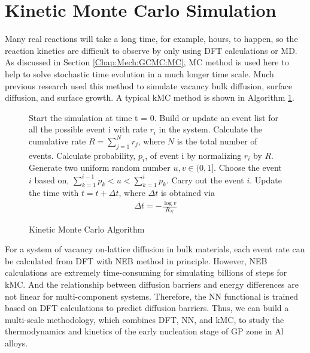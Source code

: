 \section{Kinetic Monte Carlo Simulation}
\label{chap:meth:KMC}

Many real reactions will take a long time, for example, hours, to happen, so the reaction kinetics are difficult to observe by only using \ac{DFT} calculations or \ac{MD}. As discussed in Section \ref{Chap:Mech:GCMC:MC}, \ac{MC} method is used here to help to solve stochastic time evolution in a much longer time scale. Much previous research used this method to simulate vacancy bulk diffusion, surface diffusion, and surface growth. \cite{frenkel2001understanding, leach2001molecular} A typical \ac{kMC} method is shown in Algorithm \ref{algo:kMC}.

\begin{figure}[htb]
\centering
\begin{minipage}{.7\linewidth}
\begin{algorithm}[H]
  \caption{Kinetic Monte Carlo Algorithm}\label{algo:kMC}
  \begin{algorithmic}[1]
    \State Start the simulation at time t = 0.
        \State Build or update an event list for all the possible event i with rate $r_i$ in the system.
        \State Calculate the cumulative rate $R = \sum_{j=1}^N r_j$,
            where $N$ is the total number of events. 
        \State Calculate probability, $p_i$, of event i by normalizing $r_i$ by $R$.
        \State Generate two uniform random number $u, v \in (0, 1]$.
        \State Choose the event $i$ based on,
               $\sum_{k=1}^{i-1} p_k < u < \sum_{k=1}^{i} p_k$.
        \State Carry out the event $i$.
        \State Update the time with $t = t + \Delta t$,
            where $\Delta t$ is obtained via
            \begin{align}
                \Delta t = - \frac{\log{v}}{R_N}
            \label{Chap:Meth:eq:KMC:1}
            \end{align}
    \EndWhile
\end{algorithmic}
\end{algorithm}
\end{minipage}
\end{figure}

For a system of vacancy on-lattice diffusion in bulk materials, each event rate can be calculated from \ac{DFT} with \ac{NEB} method in principle. However, \ac{NEB} calculations are extremely time-consuming for simulating billions of steps for \ac{kMC}. And the relationship between diffusion barriers and energy differences are not linear for multi-component systems. Therefore, the \ac{NN} functional is trained based on \ac{DFT} calculations to predict diffusion barriers. Thus, we can build a multi-scale methodology, which combines \ac{DFT}, \ac{NN}, and \ac{kMC}, to study the thermodynamics and kinetics of the early nucleation stage of GP zone in Al alloys.